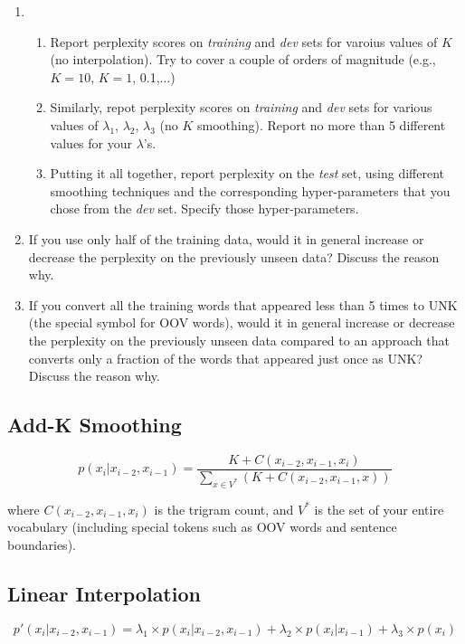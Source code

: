 \documentclass[11pt]{article}
\begin{document}
\begin{enumerate}
  \item \begin{enumerate}
  	  \item Report perplexity scores on \textit{training} and \textit{dev} sets for varoius values of $K$ (no interpolation). Try to cover a couple of orders of magnitude (e.g., $K=10$, $K=1$, 0.1,...)
	  \item Similarly, repot perplexity scores on \textit{training} and \textit{dev} sets for various values of $\lambda_1$, $\lambda_2$, $\lambda_3$ (no $K$ smoothing). Report no more than 5 different values for your $\lambda$'s.
	  \item Putting it all together, report perplexity on the \textit{test} set, using different smoothing techniques and the corresponding hyper-parameters that you chose from the \textit{dev} set. Specify those hyper-parameters.
  	  \end{enumerate}
  \item If you use only half of the training data, would it in general increase or decrease the perplexity on the previously unseen data? Discuss the reason why.
  \item If you convert all the training words that appeared less than 5 times to UNK (the special symbol for OOV words), would it in general increase or decrease the perplexity on the previously unseen data compared to an approach that converts only a fraction of the words that appeared just once as UNK? Discuss the reason why.
\end{enumerate}

\subsection*{Add-K Smoothing}
\begin{equation}
	p(x_i|x_{i-2}, x_{i-1}) = \frac{K+C(x_{i-2}, x_{i-1}, x_{i})}{\sum_{x \in V^*} ( K + C(x_{i-2}, x_{i-1}, x))}
\end{equation}

where $C(x_{i-2},x_{i-1}, x_i)$ is the trigram count, and $V^*$ is the set of your entire vocabulary (including special tokens such as OOV words and sentence boundaries).

\subsection*{Linear Interpolation}

\begin{equation}
	p'(x_i|x_{i-2},x_{i-1}) = \lambda_1 \times p( x_i | x_{i-2}, x_{i-1}) + \lambda_2 \times p( x_i | x_{i-1}) + \lambda_3 \times p(x_i)
\end{equation}
\end{document}
